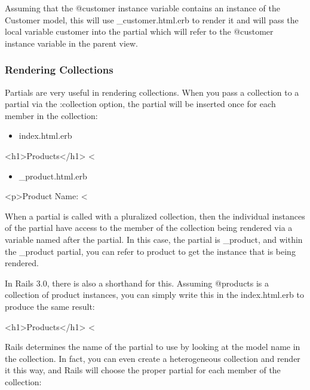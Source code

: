 \documentclass[10pt]{book}
\newenvironment{code}{%
  \scriptsize
    \verbatim
}{%
    \endverbatim
    \newline
}
\begin{document}
Assuming that the @customer instance variable contains an instance of the Customer model, this will use \_customer.html.erb to render it and will pass the local variable customer into the partial which will refer to the @customer instance variable in the parent view.

\subsubsection{ Rendering Collections}

Partials are very useful in rendering collections. When you pass a collection to a partial via the :collection option, the partial will be inserted once for each member in the collection:
\begin{itemize}
	\item index.html.erb
\end{itemize}
\begin{code}
<h1>Products</h1>
<%
\end{code}
\begin{itemize}
	\item \_product.html.erb
\end{itemize}
\begin{code}
<p>Product Name: <%
\end{code}

When a partial is called with a pluralized collection, then the  individual instances of the partial have access to the member of the  collection being rendered via a variable named after the partial. In  this case, the partial is \_product, and within the \_product partial, you can refer to product to get the instance that is being rendered.

In Rails 3.0, there is also a shorthand for this. Assuming @products is a collection of product instances, you can simply write this in the index.html.erb to produce the same result:
\begin{code}
<h1>Products</h1>
<%
\end{code}

Rails determines the name of the partial to use by looking at the  model name in the collection. In fact, you can even create a  heterogeneous collection and render it this way, and Rails will choose  the proper partial for each member of the collection:
\end{document}
